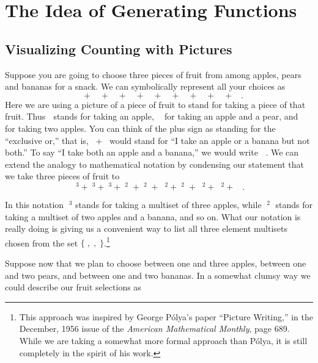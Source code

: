 \documentclass[10pt,]{book}
\theoremstyle{plain}
\theoremstyle{definition}
\theoremstyle{definition}
\numberwithin{equation}{chapter}
\newcommand{\apple}{\text{🍎}}
\newcommand{\ap}{\apple}
\newcommand{\banana}{\text{🍌}}
\newcommand{\ba}{\banana}
\newcommand{\pear}{\text{🍐}}
\newcommand{\pe}{\pear}
\begin{document}
\section[{The Idea of Generating Functions}]{The Idea of Generating Functions}\label{sec_genfns-idea}
\typeout{************************************************}
\typeout{************************************************}
\subsection[{Visualizing Counting with Pictures}]{Visualizing Counting with Pictures}\label{subsection-40}
\hypertarget{p-1045}{}%
Suppose you are going to choose three pieces of fruit from among apples, pears and bananas for a snack.  We can symbolically represent all your choices as%
\begin{equation*}
\ap\ap\ap+\pe\pe\pe+\ba\ba\ba+\ap\ap\pe+\ap\ap\ba+\ap\pe\pe +\pe\pe\ba
+\ap\ba\ba+\pe\ba\ba+\ap\pe\ba.
\end{equation*}
Here we are using a picture of a piece of fruit to stand for taking a piece of that fruit. Thus \(\ap\) stands for taking an apple, \(\ap\pe\) for taking an apple and a pear, and \(\ap\ap\) for taking two apples.  You can think of the plus sign as standing for the ``exclusive or,'' that is, \(\ap+\ba\) would stand for ``I take an apple or a banana but not both.'' To say ``I take both an apple and a banana,'' we would write \(\ap\ba\). We can extend the analogy to mathematical notation by condensing our statement that we take three pieces of fruit to%
\begin{equation*}
\ap^3+\pe^3+\ba^3+\ap^2\pe+\ap^2\ba +\ap\pe^2+\pe^2\ba+
\ap\ba^2+\pe\ba^2 +\ap\pe\ba.
\end{equation*}
%
\par
\hypertarget{p-1046}{}%
In this notation \(\ap^3\) stands for taking a multiset of three apples, while \(\ap^2\ba\) stands for taking a multiset of two apples and a banana, and so on. What our notation is really doing is giving us a convenient way to list all three element multisets chosen from the set \(\{\ap,\pe,\ba\}\).\footnote{This approach was inspired by George Pólya's paper ``Picture Writing,'' in the December, 1956 issue of the \textsl{American Mathematical Monthly}, page 689. While we are taking a somewhat more formal approach than Pólya, it is still completely in the spirit of his work.\label{fn-9}}%
\par
\hypertarget{p-1047}{}%
Suppose now that we plan to choose between one and three apples, between one and two pears, and between one and two bananas. In a somewhat clumsy way we could describe our fruit selections as%
\end{document}
